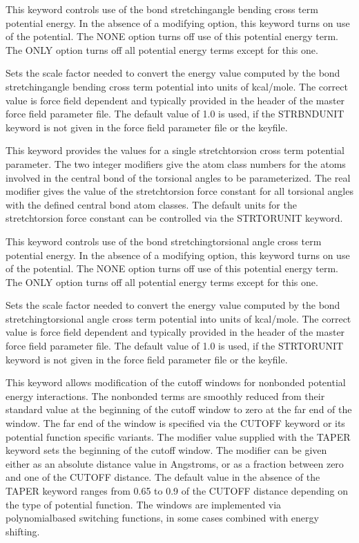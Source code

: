\documentclass[letterpaper,11pt,english]{sphinxmanual}
\begin{document}
  This keyword controls use of the bond stretching\sphinxhyphen{}angle bending cross term potential energy. In the absence of a modifying option, this keyword turns on use of the potential. The NONE option turns off use of this potential energy term. The ONLY option turns off all potential energy terms except for this one.

  Sets the scale factor needed to convert the energy value computed by the bond stretching\sphinxhyphen{}angle bending cross term potential into units of kcal/mole. The correct value is force field dependent and typically provided in the header of the master force field parameter file. The default value of 1.0 is used, if the STRBNDUNIT keyword is not given in the force field parameter file or the keyfile.

  This keyword provides the values for a single stretch\sphinxhyphen{}torsion cross term potential parameter. The two integer modifiers give the atom class numbers for the atoms involved in the central bond of the torsional angles to be parameterized. The real modifier gives the value of the stretch\sphinxhyphen{}torsion force constant for all torsional angles with the defined central bond atom classes. The default units for the stretch\sphinxhyphen{}torsion force constant can be controlled via the STRTORUNIT keyword.

  This keyword controls use of the bond stretching\sphinxhyphen{}torsional angle cross term potential energy. In the absence of a modifying option, this keyword turns on use of the potential. The NONE option turns off use of this potential energy term. The ONLY option turns off all potential energy terms except for this one.

  Sets the scale factor needed to convert the energy value computed by the bond stretching\sphinxhyphen{}torsional angle cross term potential into units of kcal/mole. The correct value is force field dependent and typically provided in the header of the master force field parameter file. The default value of 1.0 is used, if the STRTORUNIT keyword is not given in the force field parameter file or the keyfile.

  This keyword allows modification of the cutoff windows for nonbonded potential energy interactions. The nonbonded terms are smoothly reduced from their standard value at the beginning of the cutoff window to zero at the far end of the window. The far end of the window is specified via the CUTOFF keyword or its potential function specific variants. The modifier value supplied with the TAPER keyword sets the beginning of the cutoff window. The modifier can be given either as an absolute distance value in Angstroms, or as a fraction between zero and one of the CUTOFF distance. The default value in the absence of the TAPER keyword ranges from 0.65 to 0.9 of the CUTOFF distance depending on the type of potential function. The windows are implemented via polynomial\sphinxhyphen{}based switching functions, in some cases combined with energy shifting.
\end{document}
